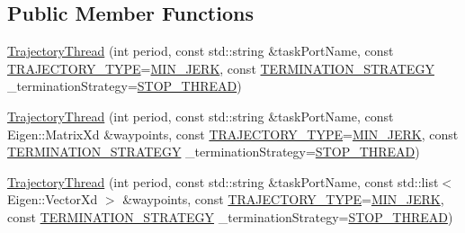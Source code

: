 \subsection*{Public Member Functions}
\begin{DoxyCompactItemize}
\item 
\hyperlink{classocra__recipes_1_1TrajectoryThread_af85d199a74007110a7654a06f9d3b172}{Trajectory\+Thread} (int period, const std\+::string \&task\+Port\+Name, const \hyperlink{namespaceocra__recipes_a729e1c8304e390d16219eda5f9756152}{T\+R\+A\+J\+E\+C\+T\+O\+R\+Y\+\_\+\+T\+Y\+PE}=\hyperlink{namespaceocra__recipes_a729e1c8304e390d16219eda5f9756152ad90eb95c7a6e37072c38d0f83980bff7}{M\+I\+N\+\_\+\+J\+E\+RK}, const \hyperlink{namespaceocra__recipes_afcf7ca623a6c39b246aa4bda629c7309}{T\+E\+R\+M\+I\+N\+A\+T\+I\+O\+N\+\_\+\+S\+T\+R\+A\+T\+E\+GY} \+\_\+termination\+Strategy=\hyperlink{namespaceocra__recipes_afcf7ca623a6c39b246aa4bda629c7309a0dc02a3e20f98a401113c91d7e6d4528}{S\+T\+O\+P\+\_\+\+T\+H\+R\+E\+AD})
\item 
\hyperlink{classocra__recipes_1_1TrajectoryThread_af4c3060ff7bf481ea13b5c81247681d4}{Trajectory\+Thread} (int period, const std\+::string \&task\+Port\+Name, const Eigen\+::\+Matrix\+Xd \&waypoints, const \hyperlink{namespaceocra__recipes_a729e1c8304e390d16219eda5f9756152}{T\+R\+A\+J\+E\+C\+T\+O\+R\+Y\+\_\+\+T\+Y\+PE}=\hyperlink{namespaceocra__recipes_a729e1c8304e390d16219eda5f9756152ad90eb95c7a6e37072c38d0f83980bff7}{M\+I\+N\+\_\+\+J\+E\+RK}, const \hyperlink{namespaceocra__recipes_afcf7ca623a6c39b246aa4bda629c7309}{T\+E\+R\+M\+I\+N\+A\+T\+I\+O\+N\+\_\+\+S\+T\+R\+A\+T\+E\+GY} \+\_\+termination\+Strategy=\hyperlink{namespaceocra__recipes_afcf7ca623a6c39b246aa4bda629c7309a0dc02a3e20f98a401113c91d7e6d4528}{S\+T\+O\+P\+\_\+\+T\+H\+R\+E\+AD})
\item 
\hyperlink{classocra__recipes_1_1TrajectoryThread_aabfcba1b3d2423f2217828331ee0eb40}{Trajectory\+Thread} (int period, const std\+::string \&task\+Port\+Name, const std\+::list$<$ Eigen\+::\+Vector\+Xd $>$ \&waypoints, const \hyperlink{namespaceocra__recipes_a729e1c8304e390d16219eda5f9756152}{T\+R\+A\+J\+E\+C\+T\+O\+R\+Y\+\_\+\+T\+Y\+PE}=\hyperlink{namespaceocra__recipes_a729e1c8304e390d16219eda5f9756152ad90eb95c7a6e37072c38d0f83980bff7}{M\+I\+N\+\_\+\+J\+E\+RK}, const \hyperlink{namespaceocra__recipes_afcf7ca623a6c39b246aa4bda629c7309}{T\+E\+R\+M\+I\+N\+A\+T\+I\+O\+N\+\_\+\+S\+T\+R\+A\+T\+E\+GY} \+\_\+termination\+Strategy=\hyperlink{namespaceocra__recipes_afcf7ca623a6c39b246aa4bda629c7309a0dc02a3e20f98a401113c91d7e6d4528}{S\+T\+O\+P\+\_\+\+T\+H\+R\+E\+AD})

\end{DoxyCompactItemize}
